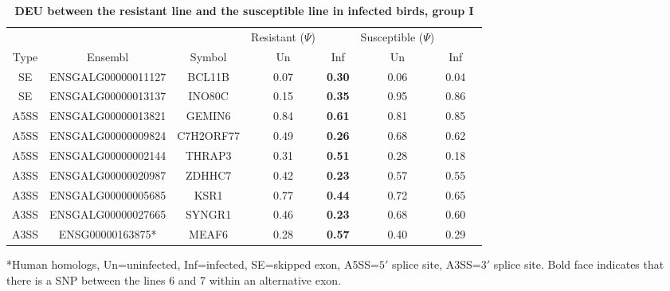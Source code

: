 \clearpage\pagestyle{lscape}
\begin{landscape}
\begin{table}[!ht]
\caption{
\textbf{DEU between the resistant line and the susceptible line
in infected birds, group I}}
\begin{center}
\begin{tabular}{cccccccc}
\hline
& & & Resistant ($\Psi$) & & Susceptible ($\Psi$) & \\
Type & Ensembl & Symbol  & Un & Inf & Un & Inf \\
\hline
SE & ENSGALG00000011127 & BCL11B & 0.07 & \textbf{0.30} & 0.06 & 0.04 \\
SE & ENSGALG00000013137 & INO80C & 0.15 & \textbf{0.35} & 0.95 & 0.86 \\
A5SS & ENSGALG00000013821 & GEMIN6 & 0.84 & \textbf{0.61} & 0.81 & 0.85 \\
A5SS & ENSGALG00000009824 & C7H2ORF77 & 0.49 & \textbf{0.26} & 0.68 & 0.62 \\
A5SS & ENSGALG00000002144 & THRAP3 & 0.31 & \textbf{0.51} & 0.28 & 0.18 \\
A3SS & ENSGALG00000020987 & ZDHHC7 & 0.42 & \textbf{0.23} & 0.57 & 0.55 \\
A3SS & ENSGALG00000005685 & KSR1 & 0.77 & \textbf{0.44} & 0.72 & 0.65 \\
A3SS & ENSGALG00000027665 & SYNGR1 & 0.46 & \textbf{0.23} & 0.68 & 0.60 \\
A3SS & ENSG00000163875* & MEAF6 & 0.28 & \textbf{0.57} & 0.40 & 0.29 \\
\hline
\end{tabular}
\begin{flushleft}
    *Human homologs, Un=uninfected, Inf=infected, SE=skipped exon,
    A5SS=$5\prime$ splice site, A3SS=$3\prime$ splice site.  Bold face
    indicates that there is a SNP between the lines 6 and 7
    within an alternative exon.
\end{flushleft}
\label{tab:line67i_diff_line67u_one}
\end{center}
\end{table}


\end{landscape}
